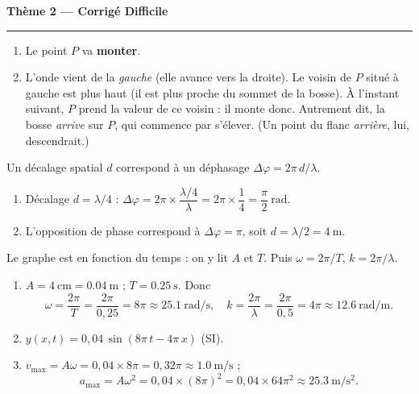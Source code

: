 \documentclass[11pt,a4paper]{article}
\begin{document}
\begin{center}
{\large\bfseries\color{excol} Thème 2 — Corrigé Difficile}\\[-2pt]
{\color{excol}\rule{5cm}{1pt}}
\end{center}

\begin{corrige}
\begin{enumerate}[label=\alph*)]
  \item Le point $P$ va \textbf{monter}.
  \item L'onde vient de la \emph{gauche} (elle avance vers la droite). Le voisin de $P$ situé à
        gauche est plus haut (il est plus proche du sommet de la bosse). À l'instant suivant,
        $P$ prend la valeur de ce voisin : il monte donc. Autrement dit, la bosse \emph{arrive}
        sur $P$, qui commence par s'élever. (Un point du flanc \emph{arrière}, lui, descendrait.)
\end{enumerate}
\end{corrige}

\begin{corrige}
Un décalage spatial $d$ correspond à un déphasage $\Delta\varphi=2\pi\,d/\lambda$.
\begin{enumerate}[label=\alph*)]
  \item Décalage $d=\lambda/4$ :
        $\Delta\varphi=2\pi\times\dfrac{\lambda/4}{\lambda}=2\pi\times\dfrac14=\dfrac{\pi}{2}\ \si{\radian}.$
  \item L'opposition de phase correspond à $\Delta\varphi=\pi$, soit $d=\lambda/2=\SI{4}{\metre}$.
\end{enumerate}
\end{corrige}

\begin{corrige}
Le graphe est en fonction du temps : on y lit $A$ et $T$. Puis $\omega=2\pi/T$, $k=2\pi/\lambda$.
\begin{enumerate}[label=\alph*)]
  \item $A=\SI{4}{\centi\metre}=\SI{0.04}{\metre}$ ; $T=\SI{0.25}{\second}$. Donc
        \[ \omega=\frac{2\pi}{T}=\frac{2\pi}{0{,}25}=8\pi\approx\SI{25.1}{\radian\per\second},
           \quad
           k=\frac{2\pi}{\lambda}=\frac{2\pi}{0{,}5}=4\pi\approx\SI{12.6}{\radian\per\metre}. \]
  \item $y(x,t)=0{,}04\,\sin\!\left(8\pi\,t - 4\pi\,x\right)$ (SI).
  \item $v_{\max}=A\omega=0{,}04\times 8\pi=0{,}32\pi\approx\SI{1.0}{\metre\per\second}$ ;
        \[ a_{\max}=A\omega^{2}=0{,}04\times(8\pi)^{2}=0{,}04\times 64\pi^{2}
           \approx\SI{25.3}{\metre\per\second\squared}. \]
\end{enumerate}
\end{corrige}
\end{document}
